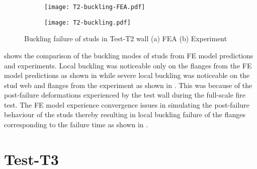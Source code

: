 \begin{figure}[!htbp]
	\centering
	\begin{subfigure}[b]{0.8\textwidth}
		\centering
		\texttt{[image: T2-buckling-FEA.pdf]}
		\caption{}
		\label{subfig:T2-buckling-FEA}
	\end{subfigure}
	\begin{subfigure}[b]{0.4\textwidth}
		\centering
		\texttt{[image: T2-buckling.pdf]}
		\caption{}
		\label{subfig:T2-buckling-FEA-Exp}
	\end{subfigure}
	   \caption{Buckling failure of studs in Test-T2 wall (a) FEA (b) Experiment}
	   \label{fig:T2-buckling-FE-vs-Exp}
\end{figure} 

 shows the comparison of the buckling modes of studs from FE model predictions and experiments. Local buckling was noticeable only on the flanges from the FE model predictions as shown in  while severe local buckling was noticeable on the stud web and flanges from the experiment as shown in . This was because of the post-failure deformations experienced by the test wall during the full-scale fire test. The FE model experience convergence issues in simulating the post-failure behaviour of the studs thereby resulting in local buckling failure of the flanges corresponding to the failure time as shown in .

\section*{Test-T3}

